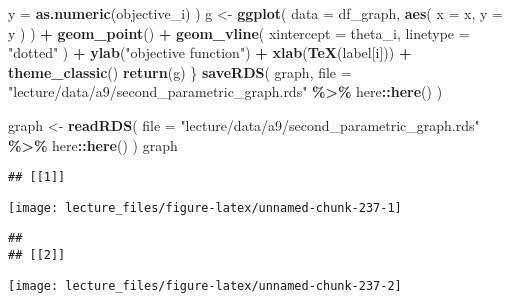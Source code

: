 \documentclass[
]{book}
\newenvironment{Shaded}{\begin{snugshade}}{\end{snugshade}}
\newcommand{\AttributeTok}[1]{\textcolor[rgb]{0.13,0.29,0.53}{#1}}
\newcommand{\FunctionTok}[1]{\textcolor[rgb]{0.13,0.29,0.53}{\textbf{#1}}}
\newcommand{\NormalTok}[1]{#1}
\newcommand{\OtherTok}[1]{\textcolor[rgb]{0.56,0.35,0.01}{#1}}
\newcommand{\SpecialCharTok}[1]{\textcolor[rgb]{0.81,0.36,0.00}{\textbf{#1}}}
\newcommand{\StringTok}[1]{\textcolor[rgb]{0.31,0.60,0.02}{#1}}
\begin{document}
\begin{Shaded}
\begin{Highlighting}[]
      \AttributeTok{y =} \FunctionTok{as.numeric}\NormalTok{(objective\_i)}
\NormalTok{      )}
\NormalTok{  g }\OtherTok{\textless{}{-}} 
    \FunctionTok{ggplot}\NormalTok{(}
      \AttributeTok{data =}\NormalTok{ df\_graph, }
      \FunctionTok{aes}\NormalTok{(}
        \AttributeTok{x =}\NormalTok{ x,}
        \AttributeTok{y =}\NormalTok{ y}
\NormalTok{        )}
\NormalTok{      ) }\SpecialCharTok{+}
    \FunctionTok{geom\_point}\NormalTok{() }\SpecialCharTok{+}
    \FunctionTok{geom\_vline}\NormalTok{(}
      \AttributeTok{xintercept =}\NormalTok{ theta\_i,}
      \AttributeTok{linetype =} \StringTok{"dotted"}
\NormalTok{      ) }\SpecialCharTok{+}
    \FunctionTok{ylab}\NormalTok{(}\StringTok{"objective function"}\NormalTok{) }\SpecialCharTok{+} 
    \FunctionTok{xlab}\NormalTok{(}\FunctionTok{TeX}\NormalTok{(label[i])) }\SpecialCharTok{+} 
    \FunctionTok{theme\_classic}\NormalTok{()}
  \FunctionTok{return}\NormalTok{(g)}
\NormalTok{\}}
\FunctionTok{saveRDS}\NormalTok{(}
\NormalTok{  graph, }
  \AttributeTok{file =} \StringTok{"lecture/data/a9/second\_parametric\_graph.rds"} \SpecialCharTok{\%\textgreater{}\%}\NormalTok{ here}\SpecialCharTok{::}\FunctionTok{here}\NormalTok{()}
\NormalTok{)}
\end{Highlighting}
\end{Shaded}

\begin{Shaded}
\begin{Highlighting}[]
\NormalTok{graph }\OtherTok{\textless{}{-}} 
  \FunctionTok{readRDS}\NormalTok{(}
    \AttributeTok{file =} \StringTok{"lecture/data/a9/second\_parametric\_graph.rds"} \SpecialCharTok{\%\textgreater{}\%}\NormalTok{ here}\SpecialCharTok{::}\FunctionTok{here}\NormalTok{()}
\NormalTok{  )}
\NormalTok{graph}
\end{Highlighting}
\end{Shaded}

\begin{verbatim}
## [[1]]
\end{verbatim}

\begin{center}\texttt{[image: lecture\_files/figure-latex/unnamed-chunk-237-1]} \end{center}

\begin{verbatim}
## 
## [[2]]
\end{verbatim}

\begin{center}\texttt{[image: lecture\_files/figure-latex/unnamed-chunk-237-2]} \end{center}
\end{document}
